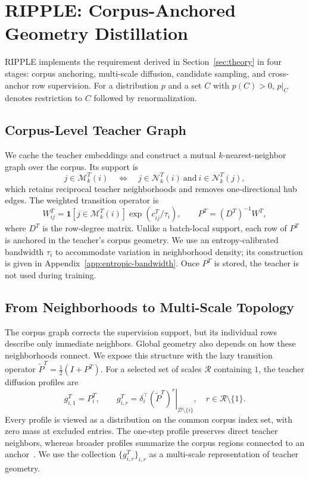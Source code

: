 \section{RIPPLE: Corpus-Anchored Geometry Distillation}
\label{sec:method}

RIPPLE implements the requirement derived in Section~\ref{sec:theory} in four stages: corpus anchoring, multi-scale diffusion, candidate sampling, and cross-anchor row supervision. For a distribution $p$ and a set $C$ with $p(C)>0$, $p|_C$ denotes restriction to $C$ followed by renormalization.

\subsection{Corpus-Level Teacher Graph}
\label{sec:graph}

We cache the teacher embeddings and construct a mutual $k$-nearest-neighbor graph over the corpus. Its support is
\begin{equation}
\label{eq:mutual-support}
j\in\mathcal M_k^T(i)
\quad\Longleftrightarrow\quad
j\in\mathcal N_k^T(i)\ \text{and}\ i\in\mathcal N_k^T(j),
\end{equation}
which retains reciprocal teacher neighborhoods and removes one-directional hub edges. The weighted transition operator is
\begin{equation}
\label{eq:teacher-operator}
W^T_{ij}=\mathbf 1[j\in\mathcal M_k^T(i)]
\exp(c^T_{ij}/\tau_i),
\qquad
P^T=(D^T)^{-1}W^T,
\end{equation}
where $D^T$ is the row-degree matrix. Unlike a batch-local support, each row of $P^T$ is anchored in the teacher's corpus geometry. We use an entropy-calibrated bandwidth $\tau_i$ to accommodate variation in neighborhood density; its construction is given in Appendix~\ref{app:entropic-bandwidth}. Once $P^T$ is stored, the teacher is not used during training.

\subsection{From Neighborhoods to Multi-Scale Topology}
\label{sec:kernels}

The corpus graph corrects the supervision support, but its individual rows describe only immediate neighbors. Global geometry also depends on how these neighborhoods connect. We expose this structure with the lazy transition operator $\widetilde P^T=\tfrac12(I+P^T)$. For a selected set of scales $\mathcal R$ containing $1$, the teacher diffusion profiles are
\begin{equation}
\label{eq:diffusion-targets}
g^T_{i,1}=P_i^T,
\qquad
g^T_{i,r}
=\left.\delta_i^\top(\widetilde P^T)^r\right|_{\mathcal D\setminus\{i\}},
\quad r\in\mathcal R\setminus\{1\}.
\end{equation}
Every profile is viewed as a distribution on the common corpus index set, with zero mass at excluded entries. The one-step profile preserves direct teacher neighbors, whereas broader profiles summarize the corpus regions connected to an anchor~\citep{coifman2006diffusionmaps}. We use the collection $\{g^T_{i,r}\}_{i,r}$ as a multi-scale representation of teacher geometry.

